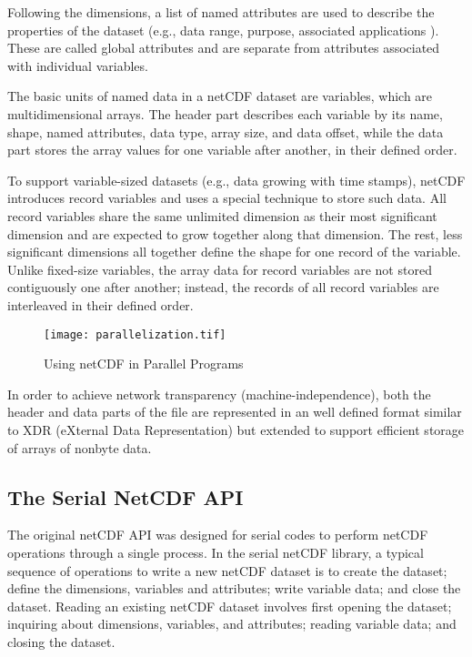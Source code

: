 \documentclass[10pt,twocolumn]{article}          %
\begin{document}
Following the dimensions, a list of named attributes are used to describe the properties of the
dataset (e.g., data range, purpose, associated applications ). These are called global
attributes and are separate from attributes associated with individual variables.

The basic units of named data in a netCDF dataset are variables, which are multidimensional
arrays. The header part describes each variable by its name, shape, named attributes, data type,
array size, and data offset, while the data part stores the array values for one variable after
another, in their defined order.

To support variable-sized datasets (e.g., data growing with
time stamps), netCDF introduces record variables and uses a special
technique to store such data. All record variables share
the same unlimited dimension as their most significant dimension
and are expected to grow together along that dimension. The rest,
less significant dimensions all together define the shape for one
record of the variable. Unlike fixed-size variables, the array
data for record variables are not stored contiguously one after
another; instead, the records of all record variables are
interleaved in their defined order.

\begin{figure*}
\begin{center}
\texttt{[image: parallelization.tif]}
\end{center}
\vskip -0.1in \caption{Using netCDF in Parallel Programs}
\label{figure:parallelization}
\end{figure*}

In order to achieve network transparency (machine-independence),
both the header and data parts of the file are represented in an
well defined format similar to XDR (eXternal Data
Representation) but extended to support efficient storage of
arrays of nonbyte data.

\subsection{The Serial NetCDF API}

The original netCDF API was designed for serial codes to perform
netCDF operations through a single process. 
In the serial netCDF library, a typical sequence of operations to write a new netCDF dataset is to
create the dataset; define the dimensions, variables and attributes; write variable data; and close
the dataset. Reading an existing netCDF dataset involves first opening the dataset; inquiring about
dimensions, variables, and attributes; reading variable data; and closing the dataset.
\end{document}
